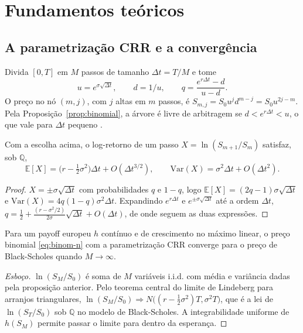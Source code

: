 \section{Fundamentos teóricos}

\subsection{A parametrização CRR e a convergência}

\begin{definicao}
Divida $[0,T]$ em $M$ passos de tamanho $\Delta t=T/M$ e tome
\begin{equation}
u=e^{\sigma\sqrt{\Delta t}},\qquad d=1/u,\qquad q=\frac{e^{r\Delta t}-d}{u-d}.
\end{equation}
O preço no nó $(m,j)$, com $j$ altas em $m$ passos, é $S_{m,j}=S_0u^jd^{m-j}=S_0u^{2j-m}$. Pela Proposição~\ref{prop:binomial}, a árvore é livre de arbitragem se $d<e^{r\Delta t}<u$, o que vale para $\Delta t$ pequeno \citep{crr1979}.
\end{definicao}

\begin{proposicao}
Com a escolha acima, o log-retorno de um passo $X=\ln(S_{m+1}/S_m)$ satisfaz, sob $\mathbb Q$,
\begin{equation}
\mathbb E[X]=\big(r-\tfrac12\sigma^2\big)\Delta t+O(\Delta t^{3/2}),\qquad \mathrm{Var}(X)=\sigma^2\Delta t+O(\Delta t^2).
\end{equation}
\end{proposicao}

\begin{proof}
$X=\pm\sigma\sqrt{\Delta t}$ com probabilidades $q$ e $1-q$, logo $\mathbb E[X]=(2q-1)\sigma\sqrt{\Delta t}$ e $\mathrm{Var}(X)=4q(1-q)\sigma^2\Delta t$. Expandindo $e^{r\Delta t}$ e $e^{\pm\sigma\sqrt{\Delta t}}$ até a ordem $\Delta t$, $q=\tfrac12+\tfrac{(r-\sigma^2/2)}{2\sigma}\sqrt{\Delta t}+O(\Delta t)$, de onde seguem as duas expressões.
\end{proof}

\begin{teorema}\label{teo:crr-conv}
Para um payoff europeu $h$ contínuo e de crescimento no máximo linear, o preço binomial \eqref{eq:binom-n} com a parametrização CRR converge para o preço de Black-Scholes quando $M\to\infty$.
\end{teorema}

\begin{proof}[Esboço]
$\ln(S_M/S_0)$ é soma de $M$ variáveis i.i.d. com média e variância dadas pela proposição anterior. Pelo teorema central do limite de Lindeberg para arranjos triangulares, $\ln(S_M/S_0)\Rightarrow N\big((r-\tfrac12\sigma^2)T,\sigma^2T\big)$, que é a lei de $\ln(S_T/S_0)$ sob $\mathbb Q$ no modelo de Black-Scholes. A integrabilidade uniforme de $h(S_M)$ permite passar o limite para dentro da esperança.
\end{proof}

